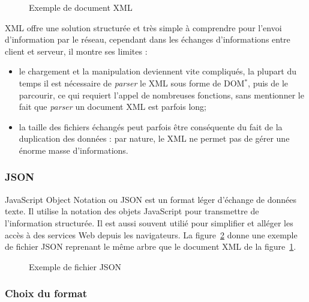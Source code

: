 \vspace{0.20cm}

\begin{figure}[!ht]
	
	\caption{Exemple de document XML}
	\label{code:exempleXML}

\end{figure}

XML offre une solution structur\'ee et tr\`es simple \`a comprendre pour l'envoi d'information par le r\'eseau, cependant dans les \'echanges d'informations entre client et serveur, il montre ses limites :

\begin{itemize}
	\item le chargement et la manipulation deviennent vite compliqu\'es, la plupart du temps il est n\'ecessaire de \textit{parser} le XML sous forme de DOM$^*$, puis de le parcourir, ce qui requiert l'appel de nombreuses fonctions, sans mentionner le fait que \textit{parser} un document XML est parfois long;
	\item la taille des fichiers \'echang\'es peut parfois \^etre cons\'equente du fait de la duplication des donn\'ees : par nature, le XML ne permet pas de g\'erer une \'enorme masse d'informations.

\end{itemize}

\subsubsection{JSON}

JavaScript Object Notation ou JSON est un format l\'eger d'\'echange de donn\'ees texte.
Il utilise la notation des objets JavaScript pour transmettre de l'information structur\'ee.
Il est aussi souvent utili\'e pour simplifier et all\'eger les acc\`es \`a des services Web depuis les navigateurs.
La figure~\ref{code:exempleJSON} donne une exemple de fichier JSON reprenant le m\^eme arbre que le document XML de la figure~\ref{code:exempleXML}.

\vspace{0.20cm}

\begin{figure}[!ht]
	
	\caption{Exemple de fichier JSON}
	\label{code:exempleJSON}

\end{figure}

\subsubsection{Choix du format}

